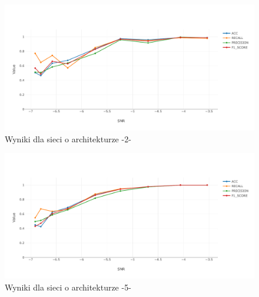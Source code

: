 \documentclass[inzynierska]{pwr_wmat_praca_dyplomowa}
\theoremstyle{plain}
\numberwithin{theorem}{chapter}
\theoremstyle{definition}
\numberwithin{theorem}{chapter}
\begin{document}
\begin{figure}[ht]
	\centering
	\includegraphics[width=14cm]{images/nn_small_2.pdf}
	\caption{Wyniki dla sieci o architekturze -2-}
	\label{wynik-est-2}
\end{figure}
\begin{figure}[ht]
	\centering
	\includegraphics[width=14cm]{images/nn_small_5.pdf}
	\caption{Wyniki dla sieci o architekturze -5-}
	\label{wynik-est-5}
\end{figure}
\end{document}
